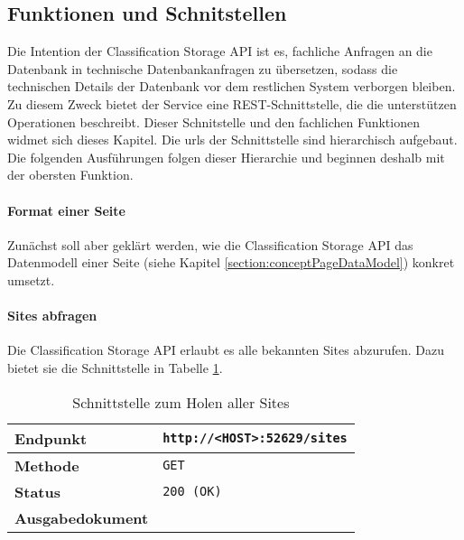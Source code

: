 \subsection{Funktionen und Schnitstellen}
    Die Intention der Classification Storage API ist es,
    fachliche Anfragen an die Datenbank in technische Datenbankanfragen zu übersetzen,
    sodass die technischen Details der Datenbank vor dem restlichen System verborgen bleiben.
    Zu diesem Zweck bietet der Service eine REST-Schnittstelle,
    die die unterstützen Operationen beschreibt.
    Dieser Schnitstelle und den fachlichen Funktionen widmet sich dieses Kapitel.
    Die \glspl{url} der Schnittstelle sind hierarchisch aufgebaut.
    Die folgenden Ausführungen folgen dieser Hierarchie und beginnen deshalb mit der obersten Funktion.

    \paragraph{Format einer Seite}
    Zunächst soll aber geklärt werden, wie die Classification Storage API das Datenmodell einer Seite
    (siehe Kapitel \ref{section:conceptPageDataModel}) konkret umsetzt.

    \paragraph{Sites abfragen}
    Die Classification Storage API erlaubt es alle bekannten Sites abzurufen.
    Dazu bietet sie die Schnittstelle in Tabelle \ref{table:getSitesInterface}.

    \begin{table}[htb]
        \centering
        \begin{tabular}{|l|l|}
        \hline
        \textbf{Endpunkt} & \texttt{http://<HOST>:52629/sites}\\
        \hline
        \textbf{Methode} & \texttt{GET}\\
        \hline
        \textbf{Status} & \texttt{200 (OK)}\\
        \hline
        \textbf{Ausgabedokument} & \\
        \hline
        \end{tabular}
        \caption{Schnittstelle zum Holen aller Sites}
        \label{table:getSitesInterface}
    \end{table}

